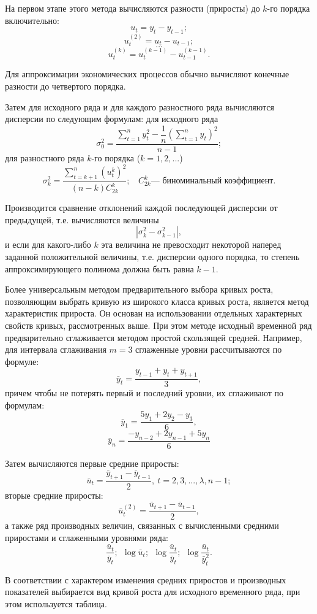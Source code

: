 На первом этапе этого метода вычисляются разности (приросты) до $k$-го порядка включительно:
\[ u_t =y_t - y_{t-1};\]
\[ u_t^{(2)} =u_t - u_{t-1}; \]
\[ \dots \]
\[u_t^{(k)} =u_t^{(k-1)} - u_{t-1}^{(k-1)}. \]

Для аппроксимации экономических процессов обычно вычисляют конечные разности до четвертого порядка.

Затем для исходного ряда и для каждого разностного ряда вычисляются дисперсии по следующим формулам: для исходного ряда
\[ \sigma_0^2 = \dfrac{\sum\limits_{t=1}^{n}y_t^2 - \dfrac{1}{n}\left(\sum\limits_{t=1}^{n}y_t\right)^2}{n-1}; \]
для разностного ряда $k$-го порядка ($k = 1, 2,...$)
\[ \sigma_k^2 =\dfrac{\sum\limits_{t=k+1}^{n}(u_t^k)^2}{(n-k)C_{2k}^k}; \ \ \ \ C_{2k}^k \text{--- биноминальный коэффициент.} \]

Производится сравнение отклонений каждой последующей дисперсии от предыдущей, т.е. вычисляются величины
\[ |\sigma_k^2 - \sigma_{k-1}^2|, \]
и если для какого-либо $k$ эта величина не превосходит некоторой наперед заданной положительной величины, т.е. дисперсии одного порядка, то степень аппроксимирующего полинома должна быть равна $k - 1$.

Более универсальным методом предварительного выбора кривых роста, позволяющим выбрать кривую из широкого класса кривых роста, является метод характеристик прироста. Он основан на использовании отдельных характерных свойств кривых, рассмотренных выше. При этом методе исходный временной ряд предварительно сглаживается методом простой скользящей средней. Например, для интервала сглаживания $m = 3$ сглаженные уровни рассчитываются по формуле:
\[ \bar{y}_t = \dfrac{y_{t-1} + y_t + y_{t+1}}{3}, \]
причем чтобы не потерять первый и последний уровни, их сглаживают по формулам:
\[ \bar{y}_1 = \dfrac{5y_{1} + 2y_2 - y_{3}}{6}, \]
\[ \bar{y}_n = \dfrac{-y_{n-2} + 2y_{n-1} + 5y_{n}}{6} \]

Затем вычисляются первые средние приросты:
\[ \bar{u}_t = \dfrac{\bar{y}_{t+1} - \bar{y}_{t-1}}{2},\ t=2,3,...,\lambda,n-1; \]
вторые средние приросты:
 \[ \bar{u}_t^{(2)} = \dfrac{\bar{u}_{t+1} - \bar{u}_{t-1}}{2}, \]
 а также ряд производных величин, связанных с вычисленными средними приростами и сглаженными уровнями ряда:
\[ \frac{\bar{u}_t}{\bar{y}_t};\ \ \log \bar{u}_t;\ \ \log \dfrac{\bar{u}_t}{\bar{y}_t};\ \ \log \dfrac{\bar{u}_t}{\bar{y}_t^2}. \]

В соответствии с характером изменения средних приростов и производных показателей выбирается вид кривой роста для исходного временного ряда, при этом используется таблица.





